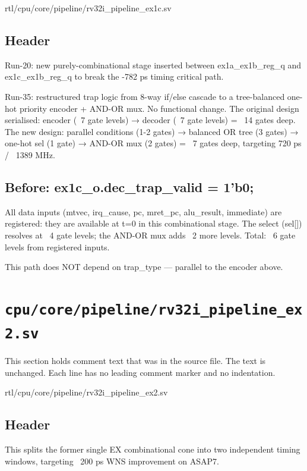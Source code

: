 \begin{relocated}{rtl/cpu/core/pipeline/rv32i_pipeline_ex1c.sv}

\subsection*{Header}

\begin{textblock}
Run-20: new purely-combinational stage inserted between ex1a_ex1b_reg_q
and ex1c_ex1b_reg_q to break the -782 ps timing critical path.

Run-35: restructured trap logic from 8-way if/else cascade to a
tree-balanced one-hot priority encoder + AND-OR mux.  No functional change.
The original design serialised: encoder (~7 gate levels) → decoder (~7 gate
levels) = ~14 gates deep.  The new design: parallel conditions (1-2 gates) →
balanced OR tree (3 gates) → one-hot sel (1 gate) → AND-OR mux (2 gates) =
~7 gates deep, targeting 720 ps / ~1389 MHz.
\end{textblock}

\subsection*{Before: ex1c\_o.dec\_trap\_valid      = 1'b0;}

\begin{textblock}
All data inputs (mtvec, irq_cause, pc, mret_pc, alu_result, immediate)
are registered: they are available at t=0 in this combinational stage.
The select (sel[]) resolves at ~4 gate levels; the AND-OR mux adds
~2 more levels.  Total: ~6 gate levels from registered inputs.

This path does NOT depend on trap_type — parallel to the encoder above.
\end{textblock}

\end{relocated}

\section{\texttt{cpu/core/pipeline/rv32i\_pipeline\_ex2.sv}}\label{tm:mod:rv32i-pipeline-ex2}

This section holds comment text that was in the source file. The text is unchanged. Each line has no leading comment marker and no indentation.

\begin{relocated}{rtl/cpu/core/pipeline/rv32i_pipeline_ex2.sv}

\subsection*{Header}

\begin{textblock}
This splits the former single EX combinational cone into two independent
timing windows, targeting ~200 ps WNS improvement on ASAP7.
\end{textblock}

\end{relocated}

